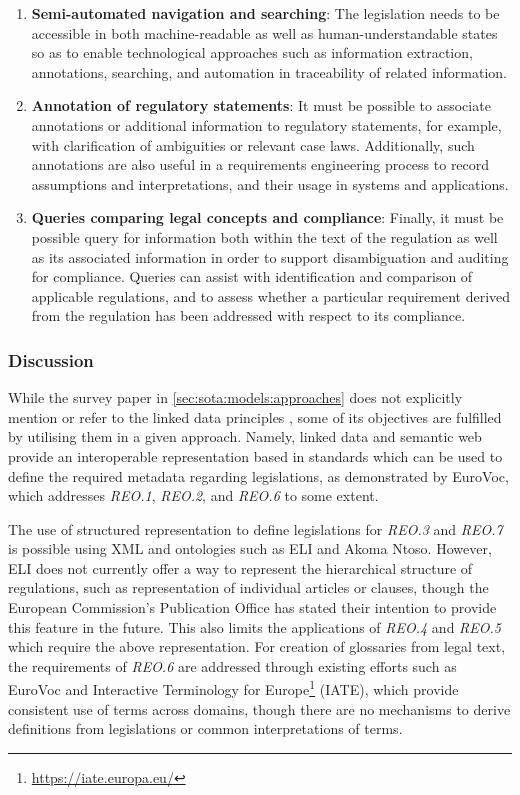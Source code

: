 \begin{enumerate}[label={\textit{REO.\theenumi}}]
    \item \textbf{Semi-automated navigation and searching}: The legislation needs to be accessible in both machine-readable as well as human-understandable states so as to enable technological approaches such as information extraction, annotations, searching, and automation in traceability of related information.
    \item \textbf{Annotation of regulatory statements}: It must be possible to associate annotations or additional information to regulatory statements, for example, with clarification of ambiguities or relevant case laws. Additionally, such annotations are also useful in a requirements engineering process to record assumptions and interpretations, and their usage in systems and applications.
    \item \textbf{Queries comparing legal concepts and compliance}: Finally, it must be possible query for information both within the text of the regulation as well as its associated information in order to support disambiguation and auditing for compliance. 
    Queries can assist with identification and comparison of applicable regulations, and to assess whether a particular requirement derived from the regulation has been addressed with respect to its compliance.
\end{enumerate}

\subsubsection*{Discussion}
While the survey paper in \autoref{sec:sota:models:approaches} does not explicitly mention or refer to the linked data principles \cite{bizer_linked_2011}, some of its objectives are fulfilled by utilising them in a given approach. Namely, linked data and semantic web provide an interoperable representation based in standards which can be used to define the required metadata regarding legislations, as demonstrated by EuroVoc, which addresses \textit{REO.1}, \textit{REO.2}, and \textit{REO.6} to some extent.

The use of structured representation to define legislations for \textit{REO.3} and \textit{REO.7} is possible using XML and ontologies such as ELI and Akoma Ntoso. However, ELI does not currently offer a way to represent the hierarchical structure of regulations, such as representation of individual articles or clauses, though the European Commission's Publication Office has stated their intention to provide this feature in the future.
This also limits the applications of \textit{REO.4} and \textit{REO.5} which require the above representation.
For creation of glossaries from legal text, the requirements of \textit{REO.6} are addressed through existing efforts such as EuroVoc and Interactive Terminology for Europe\footnote{\url{https://iate.europa.eu/}} (IATE), which provide consistent use of terms across domains, though there are no mechanisms to derive definitions from legislations or common interpretations of terms.

